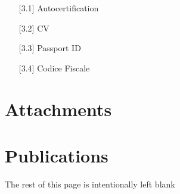 \documentclass{article}
\def\lb{\vfill{The rest of this page is intentionally left blank}\vfill}
\begin{document}
\begin{enumerate}
 \item[{[}3.1{]}] Autocertification
 \item[{[}3.2{]}] CV 
 \item[{[}3.3{]}] Passport ID
 \item[{[}3.4{]}] Codice Fiscale
\end{enumerate}


\nocite{BMMRV17, BLMR17, GMRS16IJCAI}


{\small \printbibliography[prefixnumbers={Pubb. 4.}]
}
 


\newpage

\section{Attachments}

 

\newpage

  
  \newpage
  
 








% 
% 



\center \section{Publications}
\lb
\end{document}
